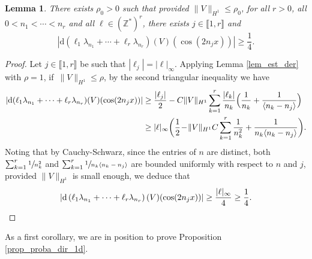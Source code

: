 \documentclass[JEP,XML,SOM,Unicode,NoEqCountersInSection,published]{cedram}
\newtheorem{lemma}[theorem]{Lemma}
\theoremstyle{definition}
\begin{document}
\begin{lemma} \label{lem_14}There exists $\rho_0>0$ such that provided $\|V\|_{H^1}\leq \rho_0$, for all $r>0$, all $0<n_1<\cdots<n_{r}$ and all $\ell\in (\mathbb{Z}^*)^{r}$, there exists $j\in \llbracket 1,r \rrbracket$ and
\[
|\mathrm{d}\left(\ell_1 \lambda_{n_1}+\cdots+\ell_r \lambda_{n_r} \right)(V)(\cos(2n_jx))| \geq \frac14.
\]
\end{lemma}
\begin{proof}
Let $j \in \llbracket 1,r \rrbracket$ be such that $|\ell_j|=|\ell|_\infty$. Applying Lemma \ref{lem_est_der} with $\rho=1$, if~$\|V\|_{H^1}\leq \rho$, by the second triangular inequality we have
\begin{equation*}
\begin{split}
|\mathrm{d}(\ell_1 \lambda_{n_1}+\cdots+\ell_r \lambda_{n_r})(V)(\cos(2n_jx))|
&\geq \frac{|\ell_j|}2 -C \|V\|_{H^1} \sum_{k=1}^{r} \frac{|\ell_k|}{n_k} \Bigl(\frac{1}{n_k} + \frac1{\langle n_k-n_j \rangle} \Bigr) \\
&\geq |\ell|_\infty \biggl(\frac12 \!-\! \|V\|_{H^1} C \sum_{k=1}^{r} \frac{1}{n_k^2} + \frac1{n_k\langle n_k-n_j \rangle} \biggr).
\end{split}
\end{equation*}
Noting that by Cauchy-Schwarz, since the entries of $n$ are distinct, both $\sum_{k=1}^{r} \sfrac{1}{n_k^2}$ and $\sum_{k=1}^{r} \sfrac1{n_k\langle n_k-n_j \rangle}$ are bounded uniformly with respect to $n$ and $j$, provided $\|V\|_{H^1}$ is small enough, we deduce that
\[
|\mathrm{d}\left(\ell_1 \lambda_{n_1}+\cdots+\ell_r \lambda_{n_r} \right)(V)(\cos(2n_jx))| \geq \frac{|\ell|_\infty}4 \geq \frac14.\qedhere
\]
\end{proof}
As a first corollary, we are in position to prove Proposition \ref{prop_proba_dir_1d}.
\end{document}
